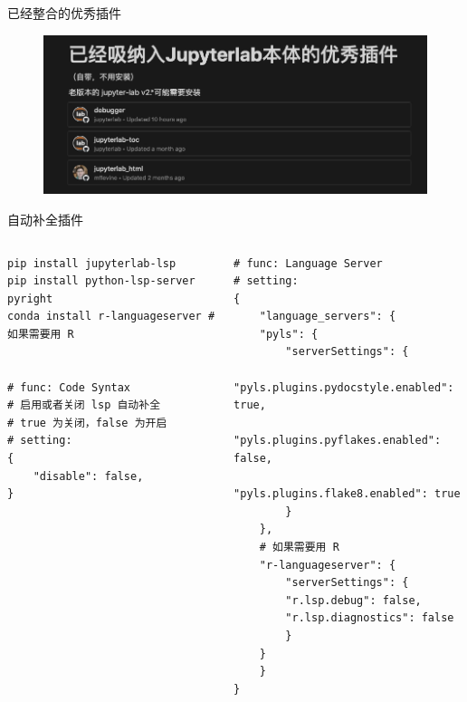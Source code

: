 \begin{frame}{已经整合的优秀插件}
    \begin{figure}
        \centering
        \includegraphics[width=0.99\linewidth]{Images/jupyterlabextension.jpg}
    \end{figure}
\end{frame}

\begin{frame}[fragile]{自动补全插件}
    \begin{columns}
        \begin{lstlisting}
pip install jupyterlab-lsp
pip install python-lsp-server pyright
conda install r-languageserver # 如果需要用 R


# func: Code Syntax 
# 启用或者关闭 lsp 自动补全
# true 为关闭，false 为开启
# setting:
{
    "disable": false,
}
        \end{lstlisting}
        \begin{lstlisting}
# func: Language Server
# setting:
{
    "language_servers": {
    "pyls": {
        "serverSettings": {
        "pyls.plugins.pydocstyle.enabled": true,
        "pyls.plugins.pyflakes.enabled": false,
        "pyls.plugins.flake8.enabled": true
        }
    },
    # 如果需要用 R
    "r-languageserver": {
        "serverSettings": {
        "r.lsp.debug": false,
        "r.lsp.diagnostics": false
        }
    }
    }
}
        \end{lstlisting}
    \end{columns}
\end{frame}
